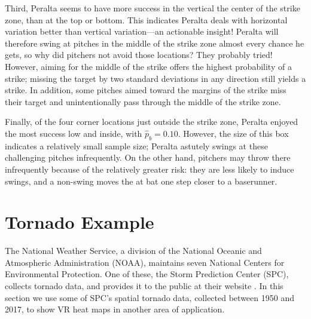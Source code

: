 Third, Peralta seems to have more success in the vertical the center of the strike zone, than at the top or bottom. This indicates Peralta deals with horizontal variation better than vertical variation---an actionable insight! Peralta will therefore swing at pitches in the middle of the strike zone almost every chance he gets, so why did pitchers not avoid those locations? They probably tried! However, aiming for the middle of the strike offers the highest probability of a strike; missing the target by two standard deviations in any direction still yields a strike. In addition, some pitches aimed toward the margins of the strike miss their target and unintentionally pass through the middle of the strike zone. 

Finally, of the four corner locations just outside the strike zone, Peralta enjoyed the most success low and inside, with $\hat{p}_{b} = 0.10$. However, the size of this box indicates a relatively small sample size; Peralta astutely swings at these challenging pitches infrequently. On the other hand, pitchers may throw there infrequently because of the relatively greater risk: they are less likely to induce swings, and a non-swing moves the at bat one step closer to a baserunner. 

\section{Tornado Example}

The National Weather Service, a division of the National Oceanic and Atmospheric Administration (NOAA), maintains seven National Centers for Environmental Protection. One of these, the Storm Prediction Center (SPC), collects tornado data, and provides it to the public at their website \citep{NOAA}. In this section we use some of SPC's spatial tornado data, collected between 1950 and 2017, to show VR heat maps in another area of application. 

